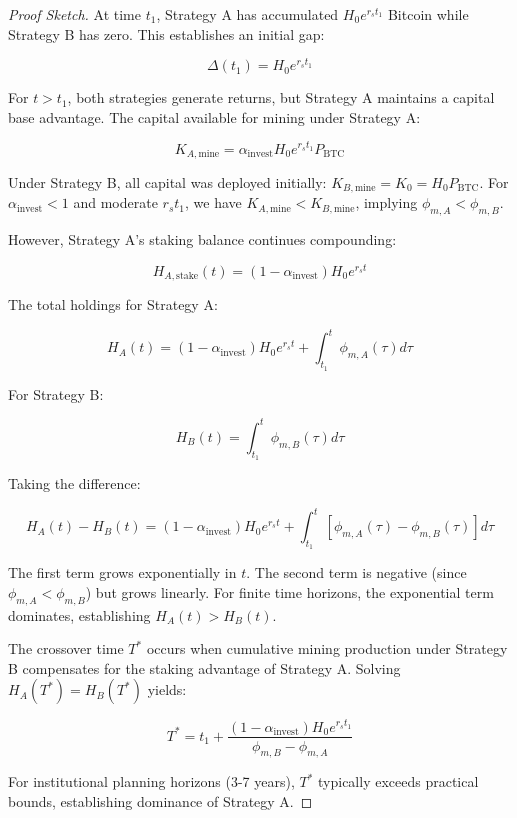 \documentclass[
  journal=medium,
  manuscript=article-type,
  year=2025,
  volume=1,
]{cup-journal}
\theoremstyle{definition}
\begin{document}
\begin{proof}[Proof Sketch]
At time $t_1$, Strategy A has accumulated $H_0 e^{r_s t_1}$ Bitcoin while Strategy B has zero. This establishes an initial gap:

\begin{equation}
\Delta(t_1) = H_0 e^{r_s t_1}
\end{equation}

For $t > t_1$, both strategies generate returns, but Strategy A maintains a capital base advantage. The capital available for mining under Strategy A:

\begin{equation}
K_{A,\text{mine}} = \alpha_{\text{invest}} H_0 e^{r_s t_1} P_{\text{BTC}}
\end{equation}

Under Strategy B, all capital was deployed initially: $K_{B,\text{mine}} = K_0 = H_0 P_{\text{BTC}}$. For $\alpha_{\text{invest}} < 1$ and moderate $r_s t_1$, we have $K_{A,\text{mine}} < K_{B,\text{mine}}$, implying $\phi_{m,A} < \phi_{m,B}$.

However, Strategy A's staking balance continues compounding:

\begin{equation}
H_{A,\text{stake}}(t) = (1 - \alpha_{\text{invest}}) H_0 e^{r_s t}
\end{equation}

The total holdings for Strategy A:

\begin{equation}
H_A(t) = (1 - \alpha_{\text{invest}}) H_0 e^{r_s t} + \int_{t_1}^{t} \phi_{m,A}(\tau) d\tau
\end{equation}

For Strategy B:

\begin{equation}
H_B(t) = \int_{t_1}^{t} \phi_{m,B}(\tau) d\tau
\end{equation}

Taking the difference:

\begin{equation}
H_A(t) - H_B(t) = (1 - \alpha_{\text{invest}}) H_0 e^{r_s t} + \int_{t_1}^{t} [\phi_{m,A}(\tau) - \phi_{m,B}(\tau)] d\tau
\end{equation}

The first term grows exponentially in $t$. The second term is negative (since $\phi_{m,A} < \phi_{m,B}$) but grows linearly. For finite time horizons, the exponential term dominates, establishing $H_A(t) > H_B(t)$.

The crossover time $T^*$ occurs when cumulative mining production under Strategy B compensates for the staking advantage of Strategy A. Solving $H_A(T^*) = H_B(T^*)$ yields:

\begin{equation}
T^* = t_1 + \frac{(1 - \alpha_{\text{invest}}) H_0 e^{r_s t_1}}{\phi_{m,B} - \phi_{m,A}}
\end{equation}

For institutional planning horizons (3-7 years), $T^*$ typically exceeds practical bounds, establishing dominance of Strategy A.
\end{proof}
\end{document}
